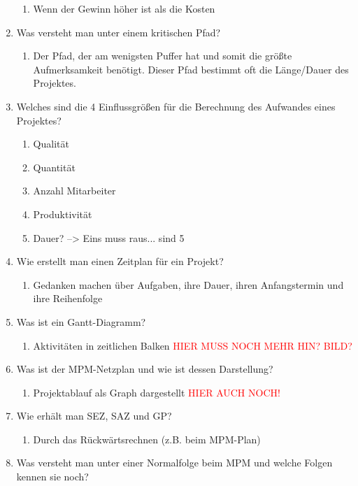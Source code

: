 \documentclass[12pt,a4paper]{article}
\begin{document}
\begin{enumerate}
	\begin{enumerate}
		\item Wenn der Gewinn höher ist als die Kosten
	\end{enumerate}
	\item Was versteht man unter einem kritischen Pfad?
	\begin{enumerate}
		\item Der Pfad, der am wenigsten Puffer hat und somit die größte Aufmerksamkeit benötigt. Dieser Pfad bestimmt oft die Länge/Dauer des Projektes.
	\end{enumerate}
	\item Welches sind die 4 Einflussgrößen für die Berechnung des Aufwandes eines Projektes?
	\begin{enumerate}
		\item Qualität
		\item Quantität
		\item Anzahl Mitarbeiter
		\item Produktivität
		\item Dauer? --> Eins muss raus... sind 5
	\end{enumerate}
	\item Wie erstellt man einen Zeitplan für ein Projekt?
	\begin{enumerate}
		\item Gedanken machen über Aufgaben, ihre Dauer, ihren Anfangstermin und ihre Reihenfolge
	\end{enumerate}
	\item Was ist ein Gantt-Diagramm?
	\begin{enumerate}
		\item Aktivitäten in zeitlichen Balken \textcolor{red}{HIER MUSS NOCH MEHR HIN? BILD?}
	\end{enumerate}
	\item Was ist der MPM-Netzplan und wie ist dessen Darstellung?
	\begin{enumerate}
		\item Projektablauf als Graph dargestellt \textcolor{red}{HIER AUCH NOCH!}
	\end{enumerate}
	\item Wie erhält man SEZ, SAZ und GP?
	\begin{enumerate}
		\item Durch das Rückwärtsrechnen (z.B. beim MPM-Plan)
	\end{enumerate}
	\item Was versteht man unter einer Normalfolge beim MPM und welche Folgen kennen sie noch?

\end{enumerate}
\end{document}
